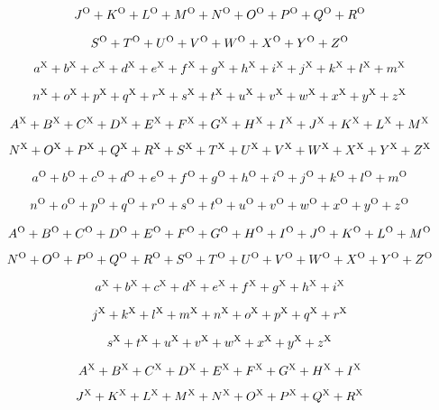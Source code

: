 $$
J^{\rm O}+
K^{\rm O}+
L^{\rm O}+
M^{\rm O}+
N^{\rm O}+
O^{\rm O}+
P^{\rm O}+
Q^{\rm O}+
R^{\rm O}
$$

$$
S^{\rm O}+
T^{\rm O}+
U^{\rm O}+
V^{\rm O}+
W^{\rm O}+
X^{\rm O}+
Y^{\rm O}+
Z^{\rm O}
$$



$$
a^{\rm X}+
b^{\rm X}+
c^{\rm X}+
d^{\rm X}+
e^{\rm X}+
f^{\rm X}+
g^{\rm X}+
h^{\rm X}+
i^{\rm X}+
j^{\rm X}+
k^{\rm X}+
l^{\rm X}+
m^{\rm X}
$$

$$n^{\rm X}+
o^{\rm X}+
p^{\rm X}+
q^{\rm X}+
r^{\rm X}+
s^{\rm X}+
t^{\rm X}+
u^{\rm X}+
v^{\rm X}+
w^{\rm X}+
x^{\rm X}+
y^{\rm X}+
z^{\rm X}
$$

$$
A^{\rm X}+
B^{\rm X}+
C^{\rm X}+
D^{\rm X}+
E^{\rm X}+
F^{\rm X}+
G^{\rm X}+
H^{\rm X}+
I^{\rm X}+
J^{\rm X}+
K^{\rm X}+
L^{\rm X}+
M^{\rm X}
$$

$$
N^{\rm X}+
O^{\rm X}+
P^{\rm X}+
Q^{\rm X}+
R^{\rm X}+
S^{\rm X}+
T^{\rm X}+
U^{\rm X}+
V^{\rm X}+
W^{\rm X}+
X^{\rm X}+
Y^{\rm X}+
Z^{\rm X}
$$


$$
a^{\rm O}+
b^{\rm O}+
c^{\rm O}+
d^{\rm O}+
e^{\rm O}+
f^{\rm O}+
g^{\rm O}+
h^{\rm O}+
i^{\rm O}+
j^{\rm O}+
k^{\rm O}+
l^{\rm O}+
m^{\rm O}
$$

$$
n^{\rm O}+
o^{\rm O}+
p^{\rm O}+
q^{\rm O}+
r^{\rm O}+
s^{\rm O}+
t^{\rm O}+
u^{\rm O}+
v^{\rm O}+
w^{\rm O}+
x^{\rm O}+
y^{\rm O}+
z^{\rm O}
$$

$$
A^{\rm O}+
B^{\rm O}+
C^{\rm O}+
D^{\rm O}+
E^{\rm O}+
F^{\rm O}+
G^{\rm O}+
H^{\rm O}+
I^{\rm O}+
J^{\rm O}+
K^{\rm O}+
L^{\rm O}+
M^{\rm O}
$$

$$
N^{\rm O}+
O^{\rm O}+
P^{\rm O}+
Q^{\rm O}+
R^{\rm O}+
S^{\rm O}+
T^{\rm O}+
U^{\rm O}+
V^{\rm O}+
W^{\rm O}+
X^{\rm O}+
Y^{\rm O}+
Z^{\rm O}
$$



$$
a^{\rm X}+
b^{\rm X}+
c^{\rm X}+
d^{\rm X}+
e^{\rm X}+
f^{\rm X}+
g^{\rm X}+
h^{\rm X}+
i^{\rm X}
$$

$$
j^{\rm X}+
k^{\rm X}+
l^{\rm X}+
m^{\rm X}+
n^{\rm X}+
o^{\rm X}+
p^{\rm X}+
q^{\rm X}+
r^{\rm X}
$$

$$
s^{\rm X}+
t^{\rm X}+
u^{\rm X}+
v^{\rm X}+
w^{\rm X}+
x^{\rm X}+
y^{\rm X}+
z^{\rm X}
$$

$$
A^{\rm X}+
B^{\rm X}+
C^{\rm X}+
D^{\rm X}+
E^{\rm X}+
F^{\rm X}+
G^{\rm X}+
H^{\rm X}+
I^{\rm X}
$$

$$
J^{\rm X}+
K^{\rm X}+
L^{\rm X}+
M^{\rm X}+
N^{\rm X}+
O^{\rm X}+
P^{\rm X}+
Q^{\rm X}+
R^{\rm X}
$$

